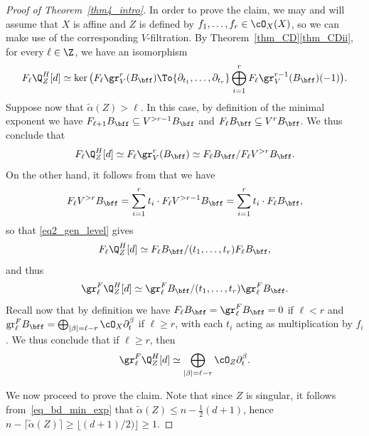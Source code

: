 \begin{proof}[Proof of Theorem~\ref{thm4_intro}]
In order to prove the claim, we may and will assume that $X$ is affine and $Z$ is defined by $f_1,\ldots,f_r\in\cO_X(X)$, so we can make use
of the corresponding $V$-filtration. By Theorem~\ref{thm_CD}\eqref{thm_CDii}, for every $\ell\in\Z$, we have an isomorphism\vspace*{-3pt}
\[F_{\ell}\Q^H_Z[d]\simeq \ker\big(F_{\ell}\gr_V^r(B_{\bff})\To{\partial_{t_1},\ldots,\partial_{t_r}}
\bigoplus_{i=1}^rF_{\ell}\gr_V^{r-1}(B_{\bff})(-1)\big).\]
Suppose now that $\widetilde{\alpha}(Z)>\ell$. In this case, by definition of the minimal exponent we have
$F_{\ell+1}B_{\bff}\subseteq V^{>r-1}B_{\bff}$ and $F_{\ell}B_{\bff}
\subseteq V^rB_{\bff}$. We thus conclude that\vspace*{-3pt}
\begin{equation}\label{eq2_gen_level}
F_{\ell}\Q^H_Z[d]\simeq F_{\ell}\gr_V^r(B_{\bff})\simeq F_{\ell}B_{\bff}/F_{\ell}V^{>r}B_{\bff}.
\end{equation}
On the other hand, it follows from \cite[Th.\,1.1]{CD} that we have\vspace*{-3pt}
\[F_{\ell}V^{>r}B_{\bff}=\sum_{i=1}^rt_i\cdot F_{\ell}V^{>r-1}B_{\bff}=\sum_{i=1}^rt_i\cdot F_{\ell}B_{\bff},\]
so that \eqref{eq2_gen_level} gives\vspace*{-3pt}
\[F_{\ell}\Q^H_Z[d]\simeq F_{\ell}B_{\bff}/(t_1,\ldots,t_r)F_{\ell}B_{\bff},\]
and thus\vspace*{-3pt}
\[\gr_{\ell}^F\Q_Z^H[d]\simeq \gr^F_{\ell}B_{\bff}/(t_1,\ldots,t_r)\gr^F_{\ell}B_{\bff}.\]
Recall now that by definition we have
$F_\ell B_\bff = \gr^F_\ell B_\bff = 0$ if $\ell < r$ and $\mathrm{gr}^F_{\ell}B_{\bff}=\bigoplus_{|\beta| = \ell -r}\cO_X\partial_t^{\beta}$ if $\ell\geq r$,
with each $t_i$ acting as multiplication by $f_i$. We thus conclude that if $\ell\geq r$, then\vspace*{-3pt}
\begin{equation}\label{eq3_gen_level}
\gr_{\ell}^F\Q_Z^H[d]\simeq\bigoplus_{|\beta| = \ell -r}\cO_Z\partial_t^{\beta}.
\end{equation}

We now proceed to prove the claim. Note that since $Z$ is singular, it follows from~\eqref{eq_bd_min_exp} that
$\widetilde{\alpha}(Z)\leq n-\tfrac{1}{2}(d+1)$, hence $n-\lceil \widetilde{\alpha}(Z)\rceil\geq\lfloor (d+1)/2)\rfloor\geq 1$.


\end{proof}

